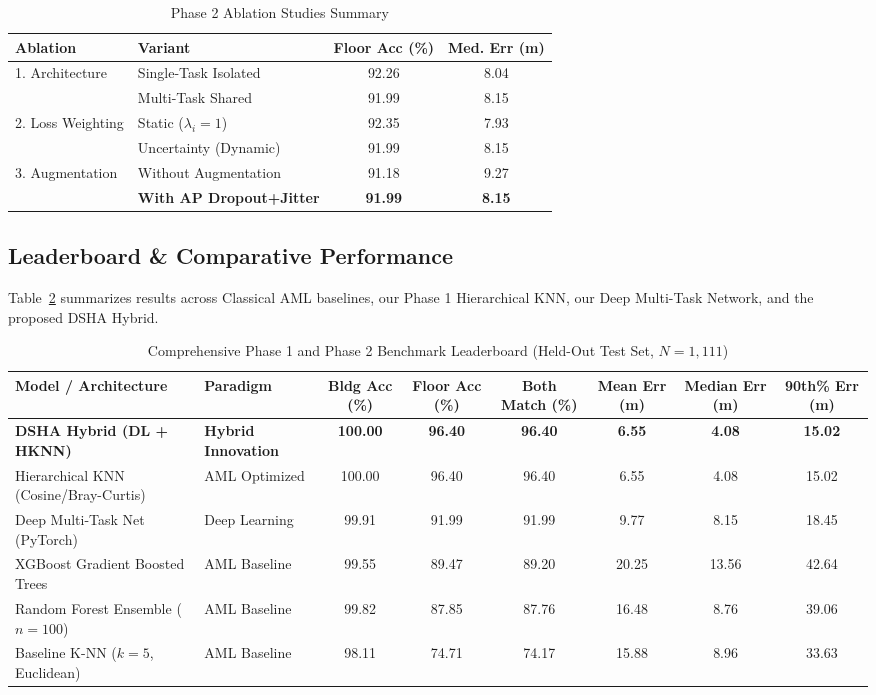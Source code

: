 \documentclass[conference]{IEEEtran}
\begin{document}
\begin{table}[htbp]
\caption{Phase 2 Ablation Studies Summary}
\label{tab:ablation}
\centering
\begin{tabular}{llcc}
\toprule
\textbf{Ablation} & \textbf{Variant} & \textbf{Floor Acc (\%)} & \textbf{Med. Err (m)} \\
\midrule
\multirow{2}{*}{1. Architecture} & Single-Task Isolated & 92.26 & 8.04 \\
 & Multi-Task Shared & 91.99 & 8.15 \\
\midrule
\multirow{2}{*}{2. Loss Weighting} & Static ($\lambda_i=1$) & 92.35 & 7.93 \\
 & Uncertainty (Dynamic) & 91.99 & 8.15 \\
\midrule
\multirow{2}{*}{3. Augmentation} & Without Augmentation & 91.18 & 9.27 \\
 & \textbf{With AP Dropout+Jitter} & \textbf{91.99} & \textbf{8.15} \\
\bottomrule
\end{tabular}
\end{table}

\subsection{Leaderboard \& Comparative Performance}
Table~\ref{tab:leaderboard} summarizes results across Classical AML baselines, our Phase 1 Hierarchical KNN, our Deep Multi-Task Network, and the proposed DSHA Hybrid.

\begin{table}[t]
\caption{Comprehensive Phase 1 and Phase 2 Benchmark Leaderboard (Held-Out Test Set, $N=1,111$)}
\label{tab:leaderboard}
\centering
\begin{tabular}{llcccccc}
\toprule
\textbf{Model / Architecture} & \textbf{Paradigm} & \textbf{Bldg Acc (\%)} & \textbf{Floor Acc (\%)} & \textbf{Both Match (\%)} & \textbf{Mean Err (m)} & \textbf{Median Err (m)} & \textbf{90th\% Err (m)} \\
\midrule
\textbf{DSHA Hybrid (DL + HKNN)} & \textbf{Hybrid Innovation} & \textbf{100.00} & \textbf{96.40} & \textbf{96.40} & \textbf{6.55} & \textbf{4.08} & \textbf{15.02} \\
Hierarchical KNN (Cosine/Bray-Curtis) & AML Optimized & 100.00 & 96.40 & 96.40 & 6.55 & 4.08 & 15.02 \\
Deep Multi-Task Net (PyTorch) & Deep Learning & 99.91 & 91.99 & 91.99 & 9.77 & 8.15 & 18.45 \\
XGBoost Gradient Boosted Trees & AML Baseline & 99.55 & 89.47 & 89.20 & 20.25 & 13.56 & 42.64 \\
Random Forest Ensemble ($n=100$) & AML Baseline & 99.82 & 87.85 & 87.76 & 16.48 & 8.76 & 39.06 \\
Baseline K-NN ($k=5$, Euclidean) & AML Baseline & 98.11 & 74.71 & 74.17 & 15.88 & 8.96 & 33.63 \\
\bottomrule
\end{tabular}
\end{table}
\end{document}
